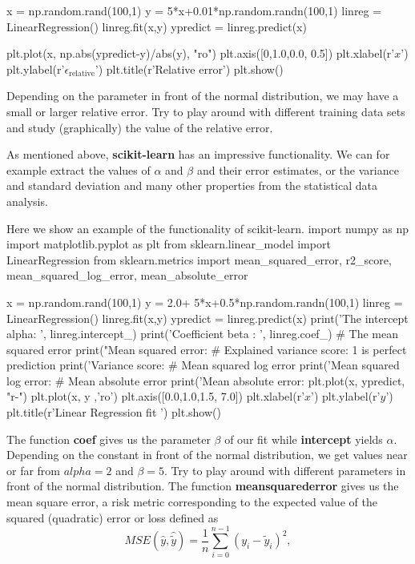 \documentclass[%
oneside,                 %
final,                   %
10pt]{article}
\begin{document}
x = np.random.rand(100,1)
y = 5*x+0.01*np.random.randn(100,1)
linreg = LinearRegression()
linreg.fit(x,y)
ypredict = linreg.predict(x)

plt.plot(x, np.abs(ypredict-y)/abs(y), "ro")
plt.axis([0,1.0,0.0, 0.5])
plt.xlabel(r'$x$')
plt.ylabel(r'$\epsilon_{\mathrm{relative}}$')
plt.title(r'Relative error')
plt.show()
\epycod

Depending on the parameter in front of the normal distribution, we may
have a small or larger relative error. Try to play around with
different training data sets and study (graphically) the value of the
relative error.

As mentioned above, \textbf{scikit-learn} has an impressive functionality.
We can for example extract the values of $\alpha$ and $\beta$ and
their error estimates, or the variance and standard deviation and many
other properties from the statistical data analysis. 

Here we show an
example of the functionality of scikit-learn.
\bpycod
import numpy as np 
import matplotlib.pyplot as plt 
from sklearn.linear_model import LinearRegression 
from sklearn.metrics import mean_squared_error, r2_score, mean_squared_log_error, mean_absolute_error

x = np.random.rand(100,1)
y = 2.0+ 5*x+0.5*np.random.randn(100,1)
linreg = LinearRegression()
linreg.fit(x,y)
ypredict = linreg.predict(x)
print('The intercept alpha: \n', linreg.intercept_)
print('Coefficient beta : \n', linreg.coef_)
# The mean squared error                               
print("Mean squared error: %
# Explained variance score: 1 is perfect prediction                                 
print('Variance score: %
# Mean squared log error                                                        
print('Mean squared log error: %
# Mean absolute error                                                           
print('Mean absolute error: %
plt.plot(x, ypredict, "r-")
plt.plot(x, y ,'ro')
plt.axis([0.0,1.0,1.5, 7.0])
plt.xlabel(r'$x$')
plt.ylabel(r'$y$')
plt.title(r'Linear Regression fit ')
plt.show()

\epycod
The function \textbf{coef} gives us the parameter $\beta$ of our fit while \textbf{intercept} yields 
$\alpha$. Depending on the constant in front of the normal distribution, we get values near or far from $alpha =2$ and $\beta =5$. Try to play around with different parameters in front of the normal distribution. The function \textbf{meansquarederror} gives us the mean square error, a risk metric corresponding to the expected value of the squared (quadratic) error or loss defined as
\[ MSE(\hat{y},\hat{\tilde{y}}) = \frac{1}{n}
\sum_{i=0}^{n-1}(y_i-\tilde{y}_i)^2, 
\] 
\end{document}
